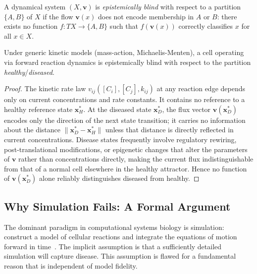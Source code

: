 \begin{definition}
\label{def:epistemic-blindness}
A dynamical system $(X, \mathbf{v})$ is \emph{epistemically blind} with
respect to a partition $\{A, B\}$ of $X$ if the flow $\mathbf{v}(x)$
does not encode membership in $A$ or $B$: there exists no function
$f: TX \to \{A, B\}$ such that $f(\mathbf{v}(x))$ correctly classifies
$x$ for all $x \in X$.
\end{definition}

\begin{proposition}
\label{prop:cells-blind}
Under generic kinetic models (mass-action, Michaelis-Menten), a cell
operating via forward reaction dynamics is epistemically blind with
respect to the partition \emph{healthy}/\emph{diseased}.
\end{proposition}

\begin{proof}
The kinetic rate law $v_{ij}([C_i], [C_j], k_{ij})$ at any reaction edge
depends only on current concentrations and rate constants.  It contains
no reference to a healthy reference state $\mathbf{x}^{*}_{H}$.  At the
diseased state $\mathbf{x}^{*}_{D}$, the flux vector
$\mathbf{v}(\mathbf{x}^{*}_{D})$ encodes only the direction of the next
state transition; it carries no information about the distance
$\|\mathbf{x}^{*}_{D} - \mathbf{x}^{*}_{H}\|$ unless that distance is
directly reflected in current concentrations.  Disease states frequently
involve regulatory rewiring, post-translational modifications, or
epigenetic changes that alter the parameters of $\mathbf{v}$ rather than
concentrations directly, making the current flux indistinguishable from
that of a normal cell elsewhere in the healthy attractor.  Hence no
function of $\mathbf{v}(\mathbf{x}^{*}_{D})$ alone reliably distinguishes
diseased from healthy.
\end{proof}

\subsection{Why Simulation Fails: A Formal Argument}

The dominant paradigm in computational systems biology is simulation:
construct a model of cellular reactions and integrate the equations of
motion forward in time~\citep{karr2012}.  The implicit assumption is that
a sufficiently detailed simulation will capture disease.  This assumption
is flawed for a fundamental reason that is independent of model fidelity.

